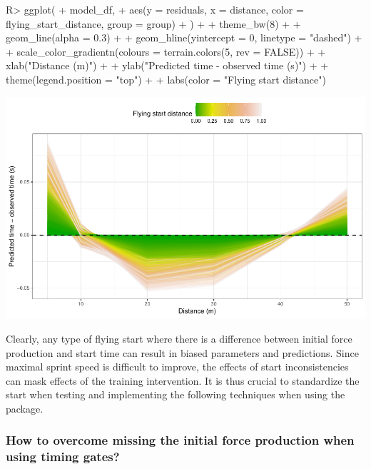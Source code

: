 \documentclass[
]{jss}
\begin{document}
\begin{CodeChunk}
\begin{CodeInput}
R> ggplot(
+   model_df,
+   aes(y = residuals, x = distance, color = flying_start_distance, group = group)
+ ) +
+   theme_bw(8) +
+   geom_line(alpha = 0.3) +
+   geom_hline(yintercept = 0, linetype = "dashed") +
+   scale_color_gradientn(colours = terrain.colors(5, rev = FALSE)) +
+   xlab("Distance (m)") +
+   ylab("Predicted time - observed time (s)") +
+   theme(legend.position = "top") + 
+   labs(color = "Flying start distance")
\end{CodeInput}


\begin{center}\includegraphics[width=1\linewidth]{paper_files/figure-latex/unnamed-chunk-28-1} \end{center}

\end{CodeChunk}

Clearly, any type of flying start where there is a difference between initial force production and start time can result in biased parameters and predictions. Since maximal sprint speed is difficult to improve, the effects of start inconsistencies can mask effects of the training intervention. It is thus crucial to standardize the start when testing and implementing the following techniques when using the  package.

\hypertarget{how-to-overcome-missing-the-initial-force-production-when-using-timing-gates}{%
\subsubsection{How to overcome missing the initial force production when using timing gates?}\label{how-to-overcome-missing-the-initial-force-production-when-using-timing-gates}}
\end{document}
